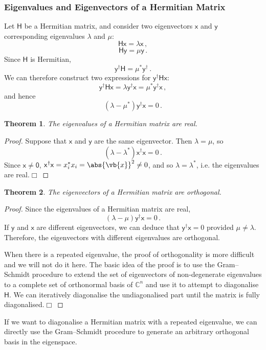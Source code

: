 \documentclass{article}
\theoremstyle{plain}\theoremheaderfont{\normalfont\itshape}\theorembodyfont{\rmfamily}\theoremseparator{.}\newtheorem*{rem}{Remark}\newtheorem*{ex}{Example}\newtheorem*{proof}{Proof}\newtheorem*{altp}{Alternative proof}
\theoremstyle{plain}\theoremheaderfont{\normalfont\bfseries}\theorembodyfont{\rmfamily}\theoremseparator{.}\newtheorem{thm}{Theorem}[section]\newtheorem{lem}[thm]{Lemma}\newtheorem{prop}[thm]{Proposition}\newtheorem*{cor}{Corollary}\newtheorem{defn}[thm]{Definition}\newtheorem{clm}[thm]{Claim}\newtheorem{clminproof}{Claim}
\theoremstyle{break}\theoremheaderfont{\normalfont\itshape}\theorembodyfont{\rmfamily}\theoremseparator{.\medskip}\newtheorem*{proofskip}{Proof}\newtheorem*{exs}{Examples}\newtheorem*{rems}{Remarks}
\theoremstyle{break}\theoremheaderfont{\normalfont\bfseries}\theorembodyfont{\rmfamily}\theoremseparator{.\medskip}\newtheorem{lemskip}[thm]{Lemma}\newtheorem{defnskip}[thm]{Definition}\newtheorem{propskip}[thm]{Proposition}\newtheorem{thmskip}[thm]{Theorem}
\numberwithin{equation}{section}
\newcommand{\qed}{\hfill\ensuremath{\Box}}
\begin{document}
	\subsubsection{Eigenvalues and Eigenvectors of a Hermitian Matrix}
	Let \(\mathsf{H}\) be a Hermitian matrix, and consider two eigenvectors \(\mathsf{x}\) and \(\mathsf{y}\) corresponding eigenvalues \(\lambda\) and \(\mu\):
	\[\mathsf{Hx}=\lambda\mathsf{x}\,,\]
	\[\mathsf{Hy}=\mu\mathsf{y}\,.\]
	Since \(\mathsf{H}\) is Hermitian,
	\[\mathsf{y^\dagger H}=\mu^*\mathsf{y}^\dagger\,.\]
	We can therefore construct two expressions for \(\mathsf{y^\dagger Hx}\):
	\[\mathsf{y^\dagger Hx}=\lambda\mathsf{y^\dagger x}=\mu^*\mathsf{y^\dagger x}\,,\]
	and hence
	\[(\lambda-\mu^*)\mathsf{y^\dagger x}=0\,.\]
	
	\begin{thm}
		The eigenvalues of a Hermitian matrix are real.
	\end{thm}
	\begin{proof}
		Suppose that \(\mathsf{x}\) and \(\mathsf{y}\) are the same eigenvector. Then \(\lambda=\mu\), so
		\[(\lambda-\lambda^*)\mathsf{x^\dagger x}=0\,.\]
		Since \(\mathsf{x\ne 0}\), \(\mathsf{x^\dagger x}=x_i^*x_i=\abs{\vb{x}}^2\ne 0\), and so \(\lambda=\lambda^*\), i.e. the eigenvalues are real.\qed
	\end{proof}
	\begin{thm}
		The eigenvectors of a Hermitian matrix are orthogonal.
	\end{thm}
	\begin{proof} Since the eigenvalues of a Hermitian matrix are real,
		\[(\lambda-\mu)\mathsf{y^\dagger x}=0\,.\]
		If \(\mathsf{y}\) and \(\mathsf{x}\) are different eigenvectors, we can deduce that \(\mathsf{y^\dagger x}=0\) provided \(\mu\ne\lambda\). Therefore, the eigenvectors with different eigenvalues are orthogonal.
		
		When there is a repeated eigenvalue, the proof of orthogonality is more difficult and we will not do it here. The basic idea of the proof is to use the Gram--Schmidt procedure to extend the set of eigenvectors of non-degenerate eigenvalues to a complete set of orthonormal basis of \(\mathbb{C}^n\) and use it to attempt to diagonalise \(\mathsf{H}\). We can iteratively diagonalise the undiagonalised part until the matrix is fully diagonalised.\qed
	\end{proof}
	If we want to diagonalise a Hermitian matrix with a repeated eigenvalue, we can directly use the Gram--Schmidt procedure to generate an arbitrary orthogonal basis in the eigenspace.
\end{document}
